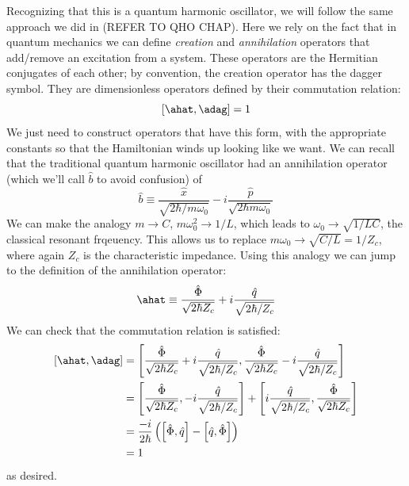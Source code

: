 Recognizing that this is a quantum harmonic oscillator, we will follow the same approach we did in (REFER TO QHO CHAP). Here we rely on the fact that in quantum mechanics we can define \textit{creation} and \textit{annihilation} operators that add/remove an excitation from a system. These operators are the Hermitian conjugates of each other; by convention, the creation operator has the dagger symbol. They are dimensionless operators defined by their commutation relation:
\begin{equation}
\left[ \ahat , \adag \right] = 1
\end{equation}
We just need to construct operators that have this form, with the appropriate constants so that the Hamiltonian winds up looking like we want. We can recall that the traditional quantum harmonic oscillator had an annihilation operator (which we'll call $\hat{b}$ to avoid confusion) of
\begin{equation*}
\hat{b}\equiv \frac{\hat{x}}{\sqrt{2\hbar/m\omega_0}} - i\frac{\hat{p}}{\sqrt{2\hbar m \omega_0}}
\end{equation*}
We can make the analogy $m\rightarrow C$, $m \omega_0^2 \rightarrow 1/L$, which leads to $\omega_0\rightarrow \sqrt{1/LC}$, the classical resonant frqeuency. This allows us to replace $m\omega_0 \rightarrow \sqrt{C/L} = 1/Z_c$, where again $Z_c$ is the characteristic impedance. Using this analogy we can jump to the definition of the annihilation operator:
\begin{equation*}
\ahat \equiv \frac{\hat{\Phi}}{\sqrt{2\hbar Z_c}} + i \frac{\hat{q}}{\sqrt{2\hbar/Z_c}}
\end{equation*}
We can check that the commutation relation is satisfied:
\begin{align*}
\left[ \ahat , \adag \right] &= \left[ \frac{\hat{\Phi}}{\sqrt{2\hbar Z_c}} + i \frac{\hat{q}}{\sqrt{2\hbar/Z_c}}, \frac{\hat{\Phi}}{\sqrt{2\hbar Z_c}} - i \frac{\hat{q}}{\sqrt{2\hbar/Z_c}}\right] \\
&= \left[\frac{\hat{\Phi}}{\sqrt{2\hbar Z_c}}, - i \frac{\hat{q}}{\sqrt{2\hbar/Z_c}} \right] + \left[i \frac{\hat{q}}{\sqrt{2\hbar/Z_c}},\frac{\hat{\Phi}}{\sqrt{2\hbar Z_c}} \right] \\
&= \frac{-i}{2 \hbar}\left(\left[\hat{\Phi},\hat{q}\right] - \left[\hat{q},\hat{\Phi}\right]\right) \\
&=1
\end{align*}
as desired. 

